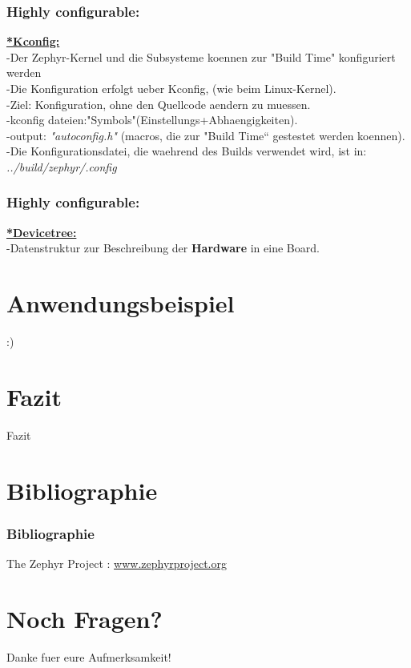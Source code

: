 \documentclass{beamer}
\begin{document}
\begin{frame}
\frametitle{Highly configurable:}

\textbf{\underline{*Kconfig:}}\\
-Der Zephyr-Kernel und die Subsysteme koennen zur "Build Time" konfiguriert werden\\
-Die Konfiguration erfolgt ueber Kconfig, (wie beim Linux-Kernel).\\
-Ziel: Konfiguration, ohne den Quellcode aendern zu muessen.\\
-kconfig dateien:"Symbols"(Einstellungs+Abhaengigkeiten).\\
-output: \textit{"autoconfig.h"} (macros, die zur "Build Time“ gestestet werden koennen).\\
-Die Konfigurationsdatei, die waehrend des Builds verwendet wird, ist in: \textit{../build/zephyr/.config}\\

\end{frame}

\begin{frame}
\frametitle{Highly configurable:}

\textbf{\underline{*Devicetree:}}\\
-Datenstruktur zur Beschreibung der \textbf{Hardware }in eine Board.




\end{frame}

\section{Anwendungsbeispiel}
\begin{frame}
	:)
\end{frame}
\section{Fazit }
\begin{frame}
Fazit
\end{frame}

\section{Bibliographie }
\begin{frame}
\frametitle{Bibliographie}
\begin{thebibliography}{10}
	
The Zephyr Project{
	 :  \url{www.zephyrproject.org}
}

\end{thebibliography}


\end{frame}


\section{Noch Fragen?}
\begin{frame}
\Huge{\centerline{Danke fuer eure Aufmerksamkeit!}}


\end{frame}

\end{document}
